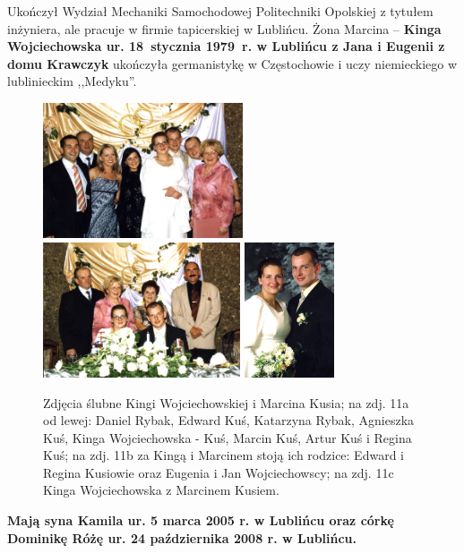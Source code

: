 Ukończył Wydział Mechaniki Samochodowej Politechniki Opolskiej z tytułem inżyniera, ale pracuje w firmie tapicerskiej w Lublińcu. Żona Marcina -- \textbf{Kinga Wojciechowska ur. 18~stycznia 1979~r. w Lublińcu z Jana i Eugenii z domu Krawczyk} ukończyła germanistykę w Częstochowie i uczy niemieckiego w lublinieckim ,,Medyku''.
\begin{figure}[!h]
\begin{center}
\includegraphics[height=40mm]{photo/marcin_kinga_kus_slub_2.jpg}
\includegraphics[height=40mm]{photo/marcin_kinga_kus_slub_3.jpg}
\includegraphics[height=40mm]{photo/marcin_kinga_kus_slub_1.jpg}
\caption[Zdjęcia ślubne Kingi Wojciechowskiej i Marcina Kusia]{Zdjęcia ślubne Kingi Wojciechowskiej i Marcina Kusia; na zdj. 11a od lewej: Daniel Rybak, Edward Kuś, Katarzyna Rybak, Agnieszka Kuś, Kinga Wojciechowska - Kuś, Marcin Kuś, Artur Kuś i Regina Kuś; na zdj. 11b za Kingą i Marcinem stoją ich rodzice: Edward i Regina Kusiowie oraz Eugenia i Jan Wojciechowscy; na zdj. 11c Kinga Wojciechowska z Marcinem Kusiem.}
\label{rys:marcin_kinga_kus_slub}
\end{center}
\end{figure}

\textbf{Mają syna Kamila ur. 5 marca 2005 r. w Lublińcu oraz córkę Dominikę Różę ur. 24 października 2008 r. w Lublińcu.}

